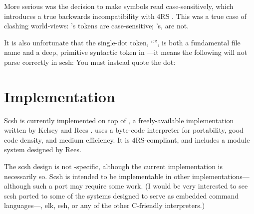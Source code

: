 More serious was the decision to make symbols read case-sensitively, 
which introduces a true backwards incompatibility with {\R4RS} {\Scheme}.
This was a true case of clashing world-views: 
{\Unix}'s tokens are case-sensitive; {\Scheme}'s, are not.

It is also unfortunate that the single-dot token, ``'', is both
a fundamental {\Unix} file name and a deep, primitive syntactic token
in {\Scheme}---it means the following will not parse correctly in scsh:
You must instead quote the dot: 


\section{Implementation}
\label{sec:impl}

Scsh is currently implemented on top of {\scm}, a freely-available
{\Scheme} implementation written by Kelsey and Rees \cite{S48}.
{\scm} uses a byte-code interpreter for portability, good code density,
and medium efficiency. It is {\R4RS}-compliant, and includes a module
system designed by Rees.

The scsh design is not {\scm}-specific, although the current implementation
is necessarily so. Scsh is intended to be implementable in other {\Scheme}
implementations---although such a port may require some work. (I would
be very interested to see scsh ported to some of the {\Scheme} systems designed
to serve as embedded command languages---\eg, elk, esh, or any of the other
C-friendly interpreters.)

